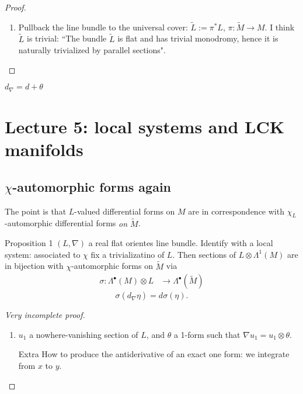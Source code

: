 \begin{proof}\leavevmode
\begin{enumerate}[label=\textbf{Step \arabic*}]
\item Pullback the line bundle to the universal cover: \(\tilde{L}:= \pi^*L\), \(\pi:\tilde{M} \to M\). I think \(\tilde{L}\) is trivial: ``The bundle \(\tilde{L}\) is flat and has trivial monodromy, hence it is naturally trivialized by parallel sections".
\end{enumerate}
\end{proof}

\begin{remark}\leavevmode
	\(d_\nabla=d+\theta\)
\end{remark}

\section{Lecture 5: local systems and LCK manifolds}

\subsection{\(\chi\)-automorphic forms again}

\begin{upshot}\leavevmode
	The point is that \(L\)-valued differential forms on \(M\) are in correspondence with \(\chi_L\)-automorphic differential forms \textit{on \(\tilde{M}\)}.
\end{upshot}

\begin{thing6}{Proposition 1}\leavevmode
\((L,\nabla)\) a real flat orientes line bundle. Identify with a local system: associated to \(\chi\) fix a trivializatino of \(L\). Then sections of \(L \otimes \Lambda^{1}(M)\) are in bijection with \(\chi\)-automorphic forms on \(\tilde{M}\) via
\begin{align*}
	\sigma: \Lambda^{\bullet}(M)\otimes L &\longrightarrow \Lambda^{\bullet}(\tilde{M}) 
\end{align*}
\[\sigma(d_\nabla \eta)=d\sigma(\eta).\]
\end{thing6}

\begin{proof}[Very incomplete proof]\leavevmode
\begin{enumerate}[label=\textbf{Step \arabic*}]
\item \(u_1\) a nowhere-vanishing section of \(L\), and \(\theta\) a 1-form such that \(\nabla u_1=u_1 \otimes \theta\).

	\begin{thing7}{Extra}\leavevmode
	How to produce the antiderivative of an exact one form: we integrate from \(x\) to \(y\).
	\end{thing7}
\end{enumerate}
\end{proof}

